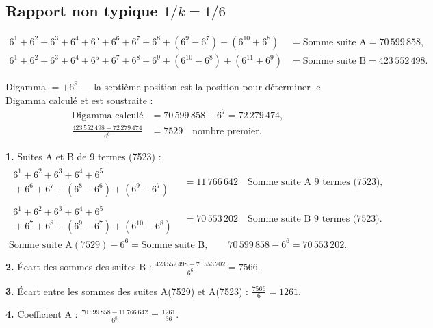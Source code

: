 \documentclass[11pt,a4paper]{article}
\begin{document}
\subsection{Rapport non typique $1/k = 1/6$}

\begin{boiteformule}[Sommes des suites A et B --- rapport $1/6$, $n = 10$]
\begin{align*}
6^{1}+6^{2}+6^{3}+6^{4}+6^{5}+6^{6}+6^{7}+6^{8}+(6^{9}-6^{7})+(6^{10}+6^{8})
  &= \text{Somme suite A} = 70\,599\,858,\\
6^{1}+6^{2}+6^{3}+6^{4}+6^{5}+6^{7}+6^{8}+6^{9}+(6^{10}-6^{8})+(6^{11}+6^{9})
  &= \text{Somme suite B} = 423\,552\,498.
\end{align*}
\end{boiteformule}

Digamma $= +6^{8}$ --- la septième position est la position pour déterminer le
Digamma calculé et est soustraite :
\begin{align*}
\text{Digamma calculé} &=70\,599\,858+6^{7}=72\,279\,474,\\
\frac{423\,552\,498-72\,279\,474}{6^{6}}
&=7529\quad\text{nombre premier}.
\end{align*}

\textbf{1.} Suites A et B de 9 termes (7523) :
\begin{align*}
\begin{gathered}
6^{1}+6^{2}+6^{3}+6^{4}+6^{5}\\
{}+6^{6}+6^{7}+(6^{8}-6^{6})+(6^{9}-6^{7})
\end{gathered}
&=11\,766\,642\quad\text{Somme suite A 9 termes (7523)},\\
\begin{gathered}
6^{1}+6^{2}+6^{3}+6^{4}+6^{5}\\
{}+6^{7}+6^{8}+(6^{9}-6^{7})+(6^{10}-6^{8})
\end{gathered}
&=70\,553\,202\quad\text{Somme suite B 9 termes (7523)}.
\end{align*}
\[
\text{Somme suite A}(7529) - 6^{6} = \text{Somme suite B},
\qquad
70\,599\,858 - 6^{6} = 70\,553\,202.
\]

\textbf{2.} Écart des sommes des suites B :
$\displaystyle \frac{423\,552\,498 - 70\,553\,202}{6^{6}} = 7566$.

\textbf{3.} Écart entre les sommes des suites A(7529) et A(7523) :
$\displaystyle \frac{7566}{6} = 1261$.

\textbf{4.} Coefficient A :
$\displaystyle \frac{70\,599\,858 - 11\,766\,642}{6^{8}} = \frac{1261}{36}$.
\end{document}
